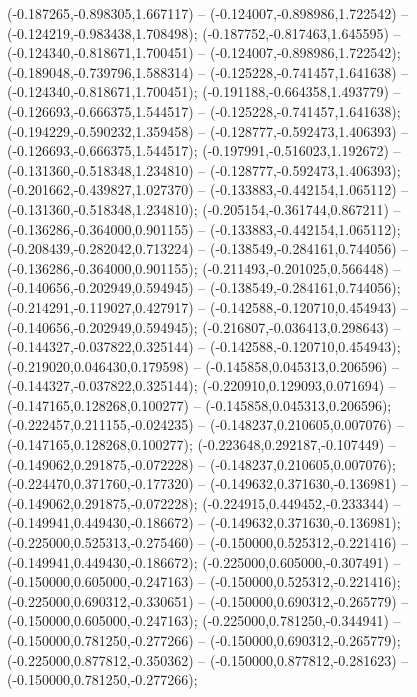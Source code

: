  (-0.187265,-0.898305,1.667117) -- (-0.124007,-0.898986,1.722542) -- (-0.124219,-0.983438,1.708498);
 (-0.187752,-0.817463,1.645595) -- (-0.124340,-0.818671,1.700451) -- (-0.124007,-0.898986,1.722542);
 (-0.189048,-0.739796,1.588314) -- (-0.125228,-0.741457,1.641638) -- (-0.124340,-0.818671,1.700451);
 (-0.191188,-0.664358,1.493779) -- (-0.126693,-0.666375,1.544517) -- (-0.125228,-0.741457,1.641638);
 (-0.194229,-0.590232,1.359458) -- (-0.128777,-0.592473,1.406393) -- (-0.126693,-0.666375,1.544517);
 (-0.197991,-0.516023,1.192672) -- (-0.131360,-0.518348,1.234810) -- (-0.128777,-0.592473,1.406393);
 (-0.201662,-0.439827,1.027370) -- (-0.133883,-0.442154,1.065112) -- (-0.131360,-0.518348,1.234810);
 (-0.205154,-0.361744,0.867211) -- (-0.136286,-0.364000,0.901155) -- (-0.133883,-0.442154,1.065112);
 (-0.208439,-0.282042,0.713224) -- (-0.138549,-0.284161,0.744056) -- (-0.136286,-0.364000,0.901155);
 (-0.211493,-0.201025,0.566448) -- (-0.140656,-0.202949,0.594945) -- (-0.138549,-0.284161,0.744056);
 (-0.214291,-0.119027,0.427917) -- (-0.142588,-0.120710,0.454943) -- (-0.140656,-0.202949,0.594945);
 (-0.216807,-0.036413,0.298643) -- (-0.144327,-0.037822,0.325144) -- (-0.142588,-0.120710,0.454943);
 (-0.219020,0.046430,0.179598) -- (-0.145858,0.045313,0.206596) -- (-0.144327,-0.037822,0.325144);
 (-0.220910,0.129093,0.071694) -- (-0.147165,0.128268,0.100277) -- (-0.145858,0.045313,0.206596);
 (-0.222457,0.211155,-0.024235) -- (-0.148237,0.210605,0.007076) -- (-0.147165,0.128268,0.100277);
 (-0.223648,0.292187,-0.107449) -- (-0.149062,0.291875,-0.072228) -- (-0.148237,0.210605,0.007076);
 (-0.224470,0.371760,-0.177320) -- (-0.149632,0.371630,-0.136981) -- (-0.149062,0.291875,-0.072228);
 (-0.224915,0.449452,-0.233344) -- (-0.149941,0.449430,-0.186672) -- (-0.149632,0.371630,-0.136981);
 (-0.225000,0.525313,-0.275460) -- (-0.150000,0.525312,-0.221416) -- (-0.149941,0.449430,-0.186672);
 (-0.225000,0.605000,-0.307491) -- (-0.150000,0.605000,-0.247163) -- (-0.150000,0.525312,-0.221416);
 (-0.225000,0.690312,-0.330651) -- (-0.150000,0.690312,-0.265779) -- (-0.150000,0.605000,-0.247163);
 (-0.225000,0.781250,-0.344941) -- (-0.150000,0.781250,-0.277266) -- (-0.150000,0.690312,-0.265779);
 (-0.225000,0.877812,-0.350362) -- (-0.150000,0.877812,-0.281623) -- (-0.150000,0.781250,-0.277266);
